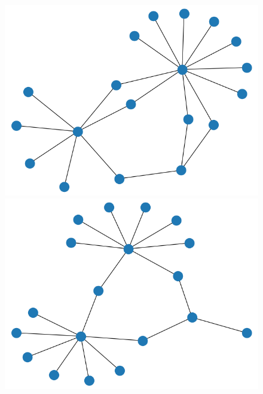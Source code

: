 \documentclass[11pt,english]{article}
\theoremstyle{plain}
\theoremstyle{remark}
\begin{document}
\begin{figure}[hbt]
    \includegraphics[scale=0.2]{timeline/state9.png}
    \includegraphics[scale=0.2]{timeline/state10.png}
    
    ~
    

\end{figure}
\end{document}
